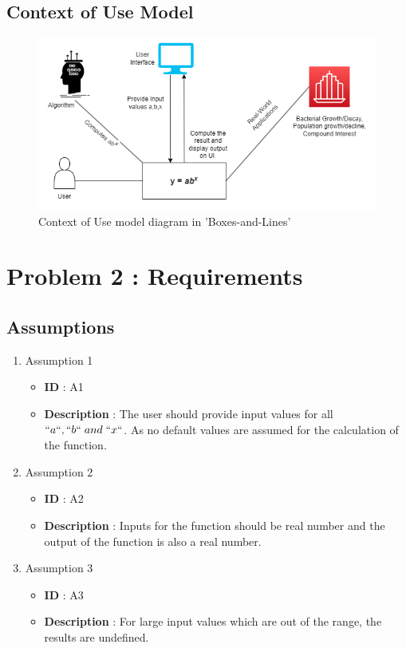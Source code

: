 \documentclass[12pt, a4paper]{article}
\begin{document}
\subsection{Context of Use Model}
\begin{figure}[h!]
	\includegraphics[width=\linewidth]{ContextOfUse.png}
	\caption{Context of Use model diagram in 'Boxes-and-Lines'}
	\label{fig:Context of Use model}
\end{figure}


\newpage

\section{Problem 2 : Requirements}
\subsection{Assumptions}
\begin{enumerate}
	\item{} Assumption 1
	\begin{itemize}
		\item \textbf{ID} : A1
		\item \textbf{Description} : The user should provide input values for all $``a``, ``b`` \hspace{1mm}and \hspace{1mm}``x``$. As  no default values are assumed for the calculation of the function.
	\end{itemize}
	     
	\item{} Assumption 2
	\begin{itemize}
		\item \textbf{ID} : A2
		\item \textbf{Description} : Inputs for the function should be real number and the output of the function is also a real number.
	\end{itemize}
	    
	\item{} Assumption 3
	\begin{itemize}
		\item \textbf{ID} : A3
		\item \textbf{Description} : For large input values which are out of the range, the results are undefined.
	\end{itemize}
	    
\end{enumerate}
\end{document}
